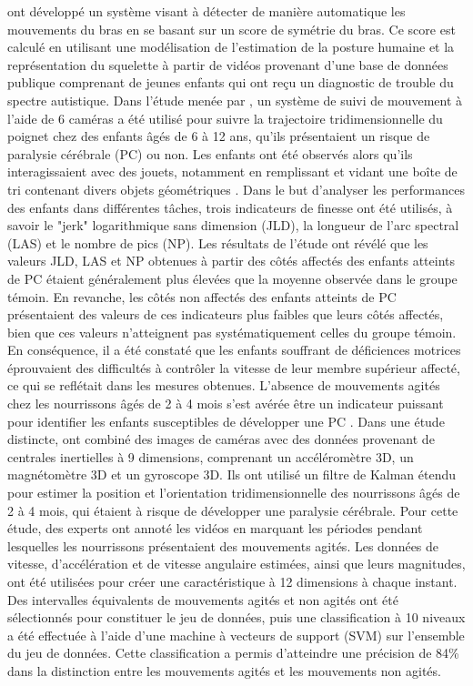 \documentclass[5pt]{article}
\begin{document}
\textcite{muty_detecting_2016} ont développé un système visant à détecter de manière automatique les mouvements du bras en se basant sur un score de symétrie du bras. Ce score est calculé en utilisant une modélisation de l'estimation de la posture humaine et la représentation du squelette à partir de vidéos provenant d'une base de données publique comprenant de jeunes enfants qui ont reçu un diagnostic de trouble du spectre autistique. Dans l'étude menée par \textcite{quijano-gonzalez_upper_2014}, un système de suivi de mouvement à l'aide de 6 caméras a été utilisé pour suivre la trajectoire tridimensionnelle du poignet chez des enfants âgés de 6 à 12 ans, qu'ils présentaient un risque de paralysie cérébrale (PC) ou non. Les enfants ont été observés alors qu'ils interagissaient avec des jouets, notamment en remplissant et vidant une boîte de tri contenant divers objets géométriques \cite{klein_instrumented_2011}. Dans le but d'analyser les performances des enfants dans différentes tâches, trois indicateurs de finesse ont été utilisés, à savoir le "jerk" logarithmique sans dimension (JLD), la longueur de l'arc spectral (LAS) et le nombre de pics (NP). Les résultats de l'étude ont révélé que les valeurs JLD, LAS et NP obtenues à partir des côtés affectés des enfants atteints de PC étaient généralement plus élevées que la moyenne observée dans le groupe témoin. En revanche, les côtés non affectés des enfants atteints de PC présentaient des valeurs de ces indicateurs plus faibles que leurs côtés affectés, bien que ces valeurs n'atteignent pas systématiquement celles du groupe témoin. En conséquence, il a été constaté que les enfants souffrant de déficiences motrices éprouvaient des difficultés à contrôler la vitesse de leur membre supérieur affecté, ce qui se reflétait dans les mesures obtenues. L'absence de mouvements agités chez les nourrissons âgés de 2 à 4 mois s'est avérée être un indicateur puissant pour identifier les enfants susceptibles de développer une PC \cite{adde_general_2007}. Dans une étude distincte, \textcite{machireddy_videoimu_2017} ont combiné des images de caméras avec des données provenant de centrales inertielles à 9 dimensions, comprenant un accéléromètre 3D, un magnétomètre 3D et un gyroscope 3D. Ils ont utilisé un filtre de Kalman étendu pour estimer la position et l'orientation tridimensionnelle des nourrissons âgés de 2 à 4 mois, qui étaient à risque de développer une paralysie cérébrale. Pour cette étude, des experts ont annoté les vidéos en marquant les périodes pendant lesquelles les nourrissons présentaient des mouvements agités. Les données de vitesse, d'accélération et de vitesse angulaire estimées, ainsi que leurs magnitudes, ont été utilisées pour créer une caractéristique à 12 dimensions à chaque instant. Des intervalles équivalents de mouvements agités et non agités ont été sélectionnés pour constituer le jeu de données, puis une classification à 10 niveaux a été effectuée à l'aide d'une machine à vecteurs de support (SVM) sur l'ensemble du jeu de données. Cette classification a permis d'atteindre une précision de 84\% dans la distinction entre les mouvements agités et les mouvements non agités.\\
\end{document}
